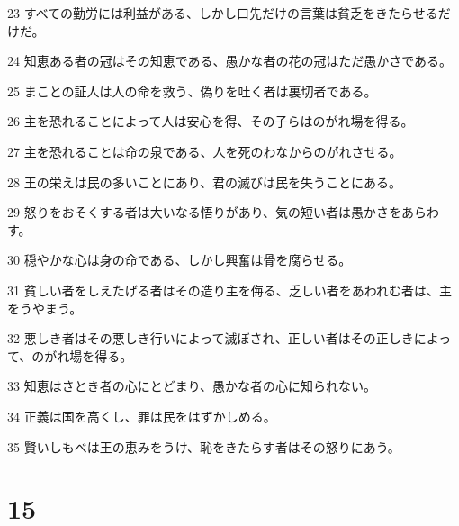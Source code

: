 \par 23 すべての勤労には利益がある、しかし口先だけの言葉は貧乏をきたらせるだけだ。
\par 24 知恵ある者の冠はその知恵である、愚かな者の花の冠はただ愚かさである。
\par 25 まことの証人は人の命を救う、偽りを吐く者は裏切者である。
\par 26 主を恐れることによって人は安心を得、その子らはのがれ場を得る。
\par 27 主を恐れることは命の泉である、人を死のわなからのがれさせる。
\par 28 王の栄えは民の多いことにあり、君の滅びは民を失うことにある。
\par 29 怒りをおそくする者は大いなる悟りがあり、気の短い者は愚かさをあらわす。
\par 30 穏やかな心は身の命である、しかし興奮は骨を腐らせる。
\par 31 貧しい者をしえたげる者はその造り主を侮る、乏しい者をあわれむ者は、主をうやまう。
\par 32 悪しき者はその悪しき行いによって滅ぼされ、正しい者はその正しきによって、のがれ場を得る。
\par 33 知恵はさとき者の心にとどまり、愚かな者の心に知られない。
\par 34 正義は国を高くし、罪は民をはずかしめる。
\par 35 賢いしもべは王の恵みをうけ、恥をきたらす者はその怒りにあう。

\chapter{15}

